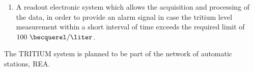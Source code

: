 \begin{enumerate}
\item{} A readout electronic system which allows the acquisition and processing of the data, in order to provide an alarm signal in case the tritium level measurement within a short interval of time exceeds the required limit of $100~\becquerel/\liter$.

\end{enumerate}

The TRITIUM system is planned to be part of the network of automatic stations, REA.